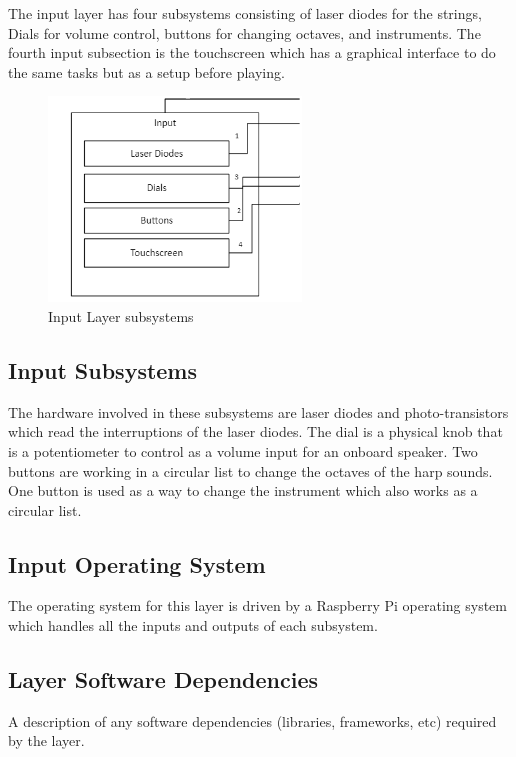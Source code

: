 The input layer has four subsystems consisting of laser diodes for the strings, Dials for volume control, buttons for changing octaves, and instruments. The fourth input subsection is the touchscreen which has a graphical interface to do the same tasks but as a setup before playing.
\begin{figure}[h!]
	\centering
 	\includegraphics[width=0.60\textwidth]{images/InputSubsystem.png}
 \caption{Input Layer subsystems}
\end{figure}

\subsection{Input Subsystems}
The hardware involved in these subsystems are laser diodes and photo-transistors which read the interruptions of the laser diodes. The dial is a physical knob that is a potentiometer to control as a volume input for an onboard speaker.  Two buttons are working in a circular list to change the octaves of the harp sounds. One button is used as a way to change the instrument which also works as a circular list. 

\subsection{Input Operating System}
The operating system for this layer is driven by a Raspberry Pi operating system which handles all the inputs and outputs of each subsystem.

\subsection{Layer Software Dependencies}
A description of any software dependencies (libraries, frameworks, etc) required by the layer.

